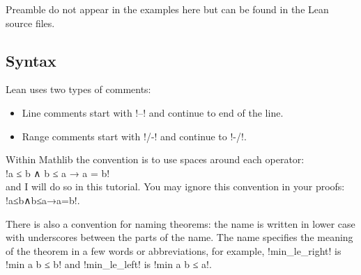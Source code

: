 Preamble do not appear in the examples here but can be found in the Lean source files.

\subsection*{Syntax}

Lean uses two types of comments: 
\begin{itemize}
\item Line comments start with !--! and continue to end of the line.
\item Range comments start with !/-! and continue to !-/!.
\end{itemize}

Within Mathlib the convention is to use spaces around each operator:\\
\indnt{}!a ≤ b ∧ b ≤ a → a = b!\\
and I will do so in this tutorial. You may ignore this convention in your proofs: !a≤b∧b≤a→a=b!.

There is also a convention for naming theorems: the name is written in lower case with underscores between the parts of the name. The name specifies the meaning of the theorem in a few words or abbreviations, for example, !min_le_right! is !min a b ≤ b! and !min_le_left! is !min a b ≤ a!.

\newpage

